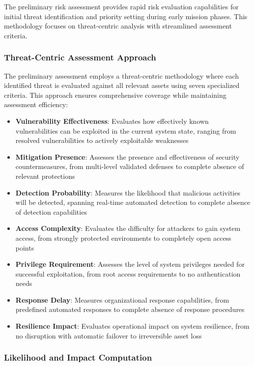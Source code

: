 \documentclass[binding=0.6cm]{sapthesis}
\begin{document}
The preliminary risk assessment provides rapid risk evaluation capabilities for initial threat identification and priority setting during early mission phases. This methodology focuses on threat-centric analysis with streamlined assessment criteria.

\subsubsection{Threat-Centric Assessment Approach}

The preliminary assessment employs a threat-centric methodology where each identified threat is evaluated against all relevant assets using seven specialized criteria. This approach ensures comprehensive coverage while maintaining assessment efficiency:

\begin{itemize}
    \item \textbf{Vulnerability Effectiveness}: Evaluates how effectively known vulnerabilities can be exploited in the current system state, ranging from resolved vulnerabilities to actively exploitable weaknesses
    \item \textbf{Mitigation Presence}: Assesses the presence and effectiveness of security countermeasures, from multi-level validated defenses to complete absence of relevant protections
    \item \textbf{Detection Probability}: Measures the likelihood that malicious activities will be detected, spanning real-time automated detection to complete absence of detection capabilities
    \item \textbf{Access Complexity}: Evaluates the difficulty for attackers to gain system access, from strongly protected environments to completely open access points
    \item \textbf{Privilege Requirement}: Assesses the level of system privileges needed for successful exploitation, from root access requirements to no authentication needs
    \item \textbf{Response Delay}: Measures organizational response capabilities, from predefined automated responses to complete absence of response procedures
    \item \textbf{Resilience Impact}: Evaluates operational impact on system resilience, from no disruption with automatic failover to irreversible asset loss
\end{itemize}

\subsubsection{Likelihood and Impact Computation}
\end{document}
